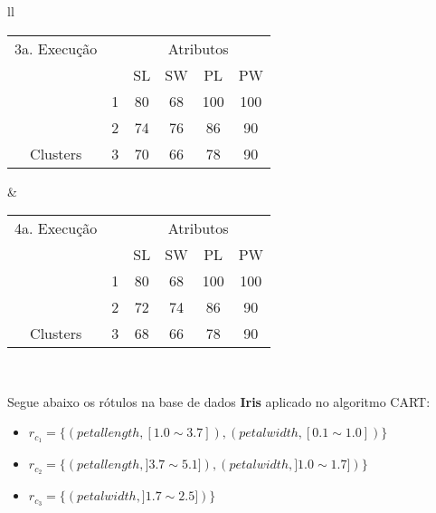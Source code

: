 \begin{table}[!h]
\begin{tabular}{ll}
   \small\addtolength{\tabcolsep}{-1pt}
     \begin{tabular}{|cl|c|c|c|c|}
        \hline \hline
         3a. Execução           &   & \multicolumn{4}{c|}{Atributos}                                               \\ \cline{3-6} 
       \multicolumn{1}{|l}{}                             &   & SL   & SW     & PL    & PW      \\ \hline
        \multicolumn{1}{|c|}{}                           & 1 & 80 & 68   & 100  & 100       \\ \cline{2-6} 
        \multicolumn{1}{|c|}{}                           & 2 & 74 & 76   & 86  &  90    \\ \cline{2-6} 
        \multicolumn{1}{|c|}{\multirow{-3}{*}{Clusters}} & 3 & 70 & 66   & 78  &   90   \\ \hline
      \end{tabular}
    
    &
    
 \small\addtolength{\tabcolsep}{-1pt}
     \begin{tabular}{|cl|c|c|c|c|}
        \hline \hline
        4a. Execução      &   & \multicolumn{4}{c|}{Atributos}                                               \\ \cline{3-6} 
       \multicolumn{1}{|l}{}                             &   & SL   & SW     & PL    & PW      \\ \hline
        \multicolumn{1}{|c|}{}                           & 1 & 80 & 68   & 100  &   100     \\ \cline{2-6} 
        \multicolumn{1}{|c|}{}                           & 2 & 72 & 74   & 86  &   90   \\ \cline{2-6} 
        \multicolumn{1}{|c|}{\multirow{-3}{*}{Clusters}} & 3 & 68 & 66   & 78  & 90     \\ \hline
      \end{tabular}
   \\
 
 \end{tabular}
 \label{tab:execucoes:iris:cart}
\end{table}


Segue abaixo os rótulos na base de dados \textbf{Iris} aplicado no algoritmo CART:
\begin{itemize}[noitemsep]
 \item ${r_{c_1}=\{ (petallength, [ 1.0 \sim 3.7]), (petalwidth,[ 0.1 \sim 1.0 ] ) \} }$  
 \item ${r_{c_2}=\{ (petallength, ] 3.7 \sim 5.1]), (petalwidth,] 1.0 \sim 1.7 ] )\} }$
 \item ${r_{c_3}=\{ (petalwidth, ] 1.7 \sim 2.5 ]) \} }$
\end{itemize}

  
 

